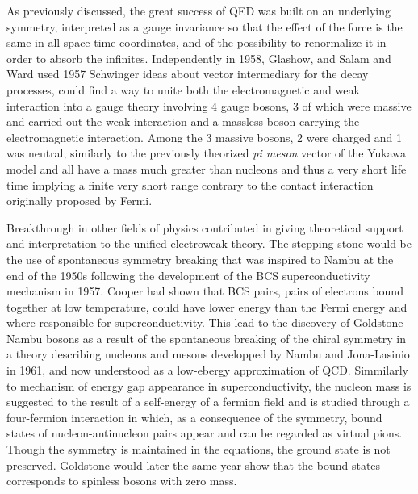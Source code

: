 	As previously discussed, the great success of QED was built on an underlying symmetry, interpreted as a gauge invariance so that the effect of the force is the same in all space-time coordinates, and of the possibility to renormalize it in order to absorb the infinites. Independently in 1958, Glashow, and Salam and Ward used 1957 Schwinger ideas about vector intermediary for the decay processes, could find a way to unite both the electromagnetic and weak interaction into a gauge theory involving 4 gauge bosons, 3 of which were massive and carried out the weak interaction and a massless boson carrying the electromagnetic interaction. Among the 3 massive bosons, 2 were charged and 1 was neutral, similarly to the previously theorized \textit{pi meson} vector of the Yukawa model and all have a mass much greater than nucleons and thus a very short life time implying a finite very short range contrary to the contact interaction originally proposed by Fermi.
	
	Breakthrough in other fields of physics contributed in giving theoretical support and interpretation to the unified electroweak theory. The stepping stone would be the use of spontaneous symmetry breaking that was inspired to Nambu at the end of the 1950s following the development of the BCS superconductivity mechanism in 1957. Cooper had shown that BCS pairs, pairs of electrons bound together at low temperature, could have lower energy than the Fermi energy and where responsible for superconductivity. This lead to the discovery of Goldstone-Nambu bosons as a result of the spontaneous breaking of the chiral symmetry in a theory describing nucleons and mesons developped by Nambu and Jona-Lasinio in 1961, and now understood as a low-ebergy approximation of QCD. Simmilarly to mechanism of energy gap appearance in superconductivity, the nucleon mass is suggested to the result of a self-energy of a fermion field and is studied through a four-fermion interaction in which, as a consequence of the symmetry, bound states of nucleon-antinucleon pairs appear and can be regarded as virtual pions. Though the symmetry is maintained in the equations, the ground state is not preserved. Goldstone would later the same year show that the bound states corresponds to spinless bosons with zero mass.
	
